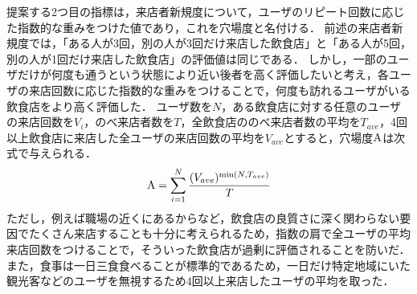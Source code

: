 提案する2つ目の指標は，来店者新規度について，ユーザのリピート回数に応じた指数的な重みをつけた値であり，これを穴場度と名付ける．
前述の来店者新規度では，「ある人が3回，別の人が3回だけ来店した飲食店」と「ある人が5回，別の人が1回だけ来店した飲食店」の評価値は同じである．
しかし，一部のユーザだけが何度も通うという状態により近い後者を高く評価したいと考え，各ユーザの来店回数に応じた指数的な重みをつけることで，何度も訪れるユーザがいる飲食店をより高く評価した．
ユーザ数を$N$，ある飲食店に対する任意のユーザの来店回数を$V_i$，のべ来店者数を$T$，全飲食店ののべ来店者数の平均を$T_{ave}$，4回以上飲食店に来店した全ユーザの来店回数の平均を$V_{ave}$とすると，穴場度$\rm A$は次式で与えられる．
\begin{equation}
	{\rm A} = \sum^{N}_{i=1} \frac{(V_{ave})^{{\rm min}(N,T_{ave})}}{T}
\end{equation}
ただし，例えば職場の近くにあるからなど，飲食店の良質さに深く関わらない要因でたくさん来店することも十分に考えられるため，指数の肩で全ユーザの平均来店回数をつけることで，そういった飲食店が過剰に評価されることを防いだ．
また，食事は一日三食食べることが標準的であるため，一日だけ特定地域にいた観光客などのユーザを無視するため4回以上来店したユーザの平均を取った．
